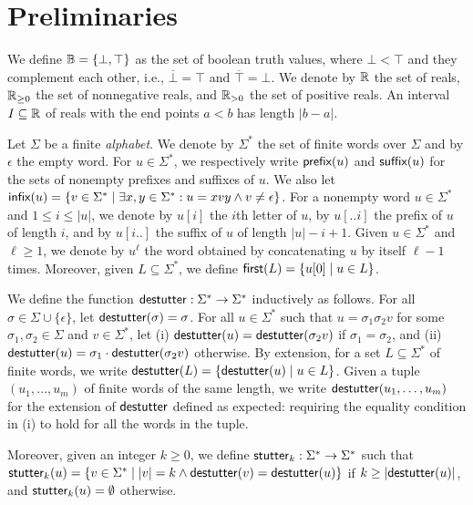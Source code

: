 \section{Preliminaries}

We define $\mathbb{B} = \{ \bot, \top \}$ as the set of boolean truth values, where $\bot < \top$ and they 
complement each other, i.e., $\overline{\bot} = \top$ and $\overline{\top} = \bot$.
%
We denote by $\mathbb{R}$ the set of reals, $\mathbb{R}_{\geq 0}$ the set of nonnegative reals, and $\mathbb{R}_{> 0}$ the 
set of positive reals.
%
An interval $I \subseteq \mathbb{R}$ of reals with the end points $a < b$ has length $|b-a|$.

Let $\Sigma$ be a finite {\em alphabet}.
%
We denote by $\Sigma^*$ the set of finite words over $\Sigma$ and by $\epsilon$ the empty word.
%
For $u \in \Sigma^*$, we respectively write $\textsf{prefix}(u)$ and $\textsf{suffix}(u)$ for the sets of nonempty prefixes 
and suffixes of $u$.
%
We also let $\infx(u) = \{v \in \Sigma^* \st \exists x,y \in \Sigma^* : u = xvy \land v \neq \epsilon\}$.
%
For a nonempty word $u \in \Sigma^*$ and $1 \leq i \leq |u|$, we denote by $u[i]$ the $i$th letter of 
$u$, by $u[..i]$ the prefix of $u$ of length $i$, and by $u[i..]$ the suffix of $u$ of length $|u| - i + 1$. 
%
Given $u \in \Sigma^*$ and $\ell \geq 1$, we denote by $u^\ell$ the word obtained by concatenating $u$ by itself $\ell - 1$ times.
Moreover, given $L \subseteq \Sigma^*$, we define $\first(L) = \{ u[0] \st u \in L\}$.

We define the function $\mathsf{destutter} : \Sigma^* \to \Sigma^*$ inductively as follows.
For all $\sigma \in \Sigma \cup \{\epsilon\}$, let $\mathsf{destutter}(\sigma) = \sigma$.
%
For all $u \in \Sigma^*$ such that $u = \sigma_1 \sigma_2 v$ for some $\sigma_1,\sigma_2 \in 
\Sigma$ and $v \in \Sigma^*$, let (i) $\mathsf{destutter}(u) = \mathsf{destutter}(\sigma_2 v)$ if $\sigma_1 = 
\sigma_2$, and (ii) $\mathsf{destutter}(u) = \sigma_1 \cdot \mathsf{destutter}(\sigma_2 v)$ otherwise.
%
By extension, for a set $L \subseteq \Sigma^*$ of finite words, we write $\destutter(L) = 
\{\destutter(u) \st u \in L\}$.
%
Given a tuple $(u_1, \ldots, u_m)$ of finite words of the same length, we write $\mathsf{destutter}(u_1, \ldots, u_m)$ for the extension of $\mathsf{destutter}$ defined as expected: requiring the equality condition in (i) to hold for all the words in the tuple.


Moreover, given an integer $k \geq 0$, we define $\mathsf{stutter}_k : \Sigma^* \to \Sigma^*$ such that $\stutter_k(u) = \{v \in \Sigma^* \st |v| = k \land \destutter(v) = \destutter(u)\}$ if $k \geq |\mathsf{destutter}(u)|$, and $\mathsf{stutter}_k(u) = \emptyset$ otherwise.

